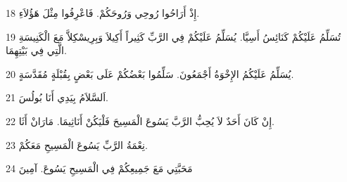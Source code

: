 \par 18 إِذْ أَرَاحُوا رُوحِي وَرُوحَكُمْ. فَاعْرِفُوا مِثْلَ هَؤُلاَءِ.
\par 19 تُسَلِّمُ عَلَيْكُمْ كَنَائِسُ أَسِيَّا. يُسَلِّمُ عَلَيْكُمْ فِي الرَّبِّ كَثِيراً أَكِيلاَ وَبِرِيسْكِلاَّ مَعَ الْكَنِيسَةِ الَّتِي فِي بَيْتِهِمَا.
\par 20 يُسَلِّمُ عَلَيْكُمُ الإِخْوَةُ أَجْمَعُونَ. سَلِّمُوا بَعْضُكُمْ عَلَى بَعْضٍ بِقُبْلَةٍ مُقَدَّسَةٍ.
\par 21 اَلسَّلاَمُ بِيَدِي أَنَا بُولُسَ.
\par 22 إِنْ كَانَ أَحَدٌ لاَ يُحِبُّ الرَّبَّ يَسُوعَ الْمَسِيحَ فَلْيَكُنْ أَنَاثِيمَا. مَارَانْ أَثَا.
\par 23 نِعْمَةُ الرَّبِّ يَسُوعَ الْمَسِيحِ مَعَكُمْ.
\par 24 مَحَبَّتِي مَعَ جَمِيعِكُمْ فِي الْمَسِيحِ يَسُوعَ. آمِينَ


